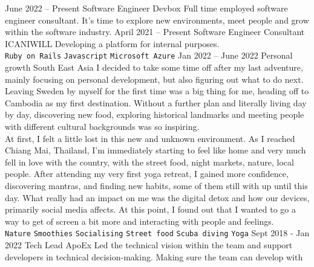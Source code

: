 \documentclass[9pt]{template} %
\begin{document}
\begin{entrylist}
  \entry
    {June 2022 -- Present}
    {Software Engineer}
    {Devbox}
    {Full time employed software engineer consultant. It's time to
      explore new environments, meet people and grow within the software
      industry.
      }
  \entry
    {April 2021 -- Present}
    {Software Engineer Consultant}
    {ICANIWILL}
    {Developing a platform for internal purposes.\\
      \texttt{Ruby on Rails}\slashsep
      \texttt{Javascript}\slashsep
      \texttt{Microsoft Azure}
    }
  \entry
    {Jan 2022 -- June 2022}
    {Personal growth}
    {South East Asia}
    {I decided to take some time off after my last adventure, mainly focusing on
      personal development, but also figuring out what to do next. Leaving Sweden
      by myself for the first time was a big thing for me, heading off to
      Cambodia as my first destination. Without a further plan and literally
      living day by day, discovering new food, exploring historical landmarks
      and meeting people with different cultural backgrounds was so inspiring.\\
      At first, I felt a little lost in this new and unknown environment. As I
      reached Chiang Mai, Thailand, I'm immediately starting to feel like home and
      very much fell in love with the country, with the street food, night markets,
      nature, local people. After attending my very first yoga retreat, I
      gained more confidence, discovering mantras, and finding new habits, some
      of them still with up until this day. What really had an impact on me was
      the digital detox and how our devices, primarily social media affects.
      At this point, I found out that I wanted to go a way to get of screen a
      bit more and interacting with people and feelings.\\
      \texttt{Nature}\slashsep
      \texttt{Smoothies}\slashsep
      \texttt{Socialising}\slashsep
      \texttt{Street food}\slashsep
      \texttt{Scuba diving}\slashsep
      \texttt{Yoga}
    }
  \entry
    {Sept 2018 - Jan 2022}
    {Tech Lead}
    {ApoEx}
    {Led the technical vision within the team and support developers in
      technical decision-making. Making sure the team can develop with
}
\end{entrylist}
\end{document}
